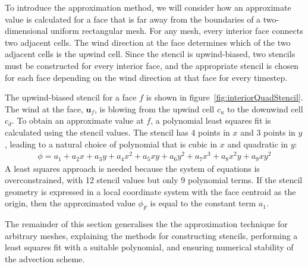 To introduce the approximation method, we will consider how an approximate value is calculated for a face that is far away from the boundaries of a two-dimensional uniform rectangular mesh.  For any mesh, every interior face connects two adjacent cells.  The wind direction at the face determines which of the two adjacent cells is the upwind cell.  Since the stencil is upwind-biased, two stencils must be constructed for every interior face, and the appropriate stencil is chosen for each face depending on the wind direction at that face for every timestep.

The upwind-biased stencil for a face $f$ is shown in figure~\ref{fig:interiorQuadStencil}.  The wind at the face, $\mathbf{u}_f$, is blowing from the upwind cell $c_u$ to the downwind cell $c_d$.
To obtain an approximate value at $f$, a polynomial least squares fit is calculated using the stencil values.
The stencil has \num{4} points in $x$ and \num{3} points in $y$, leading to a natural choice of polynomial that is cubic in $x$ and quadratic in $y$:
\begin{align}
	\phi = a_1 + a_2 x + a_3 y + a_4 x^2 + a_5 xy + a_6 y^2 + a_7 x^3 + a_8 x^2 y + a_9 x y^2 \label{eqn:fullPoly}
\end{align}
A least squares approach is needed because the system of equations is overconstrained, with \num{12} stencil values but only \num{9} polynomial terms.  If the stencil geometry is expressed in a local coordinate system with the face centroid as the origin, then the approximated value $\phi_F$ is equal to the constant term $a_1$.

The remainder of this section generalises the the approximation technique for arbitrary meshes, explaining the methods for constructing stencils, performing a least squares fit with a suitable polynomial, and ensuring numerical stability of the advection scheme.

